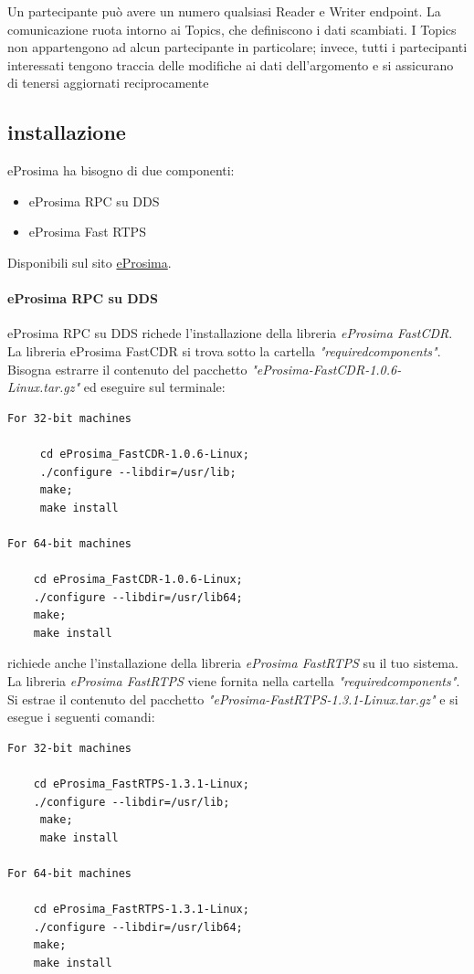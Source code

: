 \documentclass[a4paper]{article}
\begin{document}
Un partecipante può avere un numero qualsiasi Reader e Writer endpoint.
La comunicazione ruota intorno ai Topics, che definiscono i dati scambiati. I Topics non appartengono ad alcun partecipante in particolare; invece, tutti i partecipanti interessati tengono traccia delle modifiche ai dati dell'argomento e si assicurano di tenersi aggiornati reciprocamente
\subsection{installazione}
eProsima ha bisogno di due componenti:
\begin{itemize}
\item eProsima RPC su DDS
\item eProsima Fast RTPS
\end{itemize}

Disponibili sul sito \href{https://www.eprosima.com/}{eProsima}.
\paragraph{eProsima RPC su DDS}
eProsima RPC su DDS richede l'installazione della libreria \textit{eProsima FastCDR}. La libreria eProsima FastCDR si trova sotto la cartella
\textit{"requiredcomponents"}. Bisogna estrarre il contenuto del pacchetto \textit{"eProsima-FastCDR-1.0.6-Linux.tar.gz"}
ed eseguire sul terminale:
\begin{verbatim}
For 32-bit machines

     cd eProsima_FastCDR-1.0.6-Linux;
     ./configure --libdir=/usr/lib;
     make; 
     make install
     
For 64-bit machines

    cd eProsima_FastCDR-1.0.6-Linux; 
    ./configure --libdir=/usr/lib64;
    make;
    make install
\end{verbatim}
richiede anche l'installazione della libreria \textit{eProsima FastRTPS} su
il tuo sistema. La libreria \textit{eProsima FastRTPS} viene fornita nella cartella
\textit{"requiredcomponents"}. Si estrae il contenuto del pacchetto
\textit{"eProsima-FastRTPS-1.3.1-Linux.tar.gz"} e si esegue i seguenti comandi:

\begin{verbatim}
For 32-bit machines

    cd eProsima_FastRTPS-1.3.1-Linux; 
    ./configure --libdir=/usr/lib;
     make; 
     make install

For 64-bit machines

    cd eProsima_FastRTPS-1.3.1-Linux;
    ./configure --libdir=/usr/lib64;
    make;
    make install

\end{verbatim}
\end{document}
